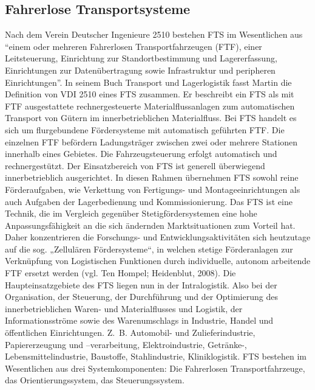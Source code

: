 \subsection{Fahrerlose Transportsysteme}
Nach dem Verein Deutscher Ingenieure 2510 bestehen FTS im Wesentlichen aus "`einem oder mehreren 
Fahrerlosen Transportfahrzeugen (FTF), einer Leitsteuerung, Einrichtung zur Standortbestimmung und 
Lagererfassung, Einrichtungen zur Daten\"ubertragung sowie Infrastruktur und peripheren Einrichtungen"'. 
In seinem Buch Transport und Lagerlogistik fasst Martin die Definition von VDI 2510 eines FTS zusammen.
Er beschreibt ein FTS als mit FTF ausgestattete rechnergesteuerte Materialflussanlagen zum automatischen 
Transport von G\"utern im innerbetrieblichen Materialfluss\cite[vgl.][S. 262f]{Martin:2006}. Bei FTS handelt 
es sich um flurgebundene F\"ordersysteme mit automatisch gef\"uhrten FTF. Die einzelnen FTF bef\"ordern 
Ladungstr\"ager zwischen zwei oder mehrere Stationen innerhalb eines Gebietes. Die Fahrzeugsteuerung erfolgt 
automatisch und rechnergest\"utzt. Der Einsatzbereich von FTS ist generell \"uberwiegend innerbetrieblich 
ausgerichtet. In diesen Rahmen \"ubernehmen FTS sowohl reine F\"orderaufgaben, wie Verkettung von Fertigungs- 
und Montageeinrichtungen als auch Aufgaben der Lagerbedienung und Kommissionierung\cite[vgl.][S. 3]{Guenther;Krueger:2000}. 
Das FTS ist eine Technik, die im Vergleich gegen\"uber Stetigf\"ordersystemen eine hohe Anpassungsf\"ahigkeit an die 
sich \"andernden Marktsituationen zum Vorteil hat. Daher konzentrieren die Forschungs- und Entwicklungsaktivit\"aten 
sich heutzutage auf die sog. „Zellul\"aren F\"ordersysteme“, in welchen stetige F\"orderanlagen zur Verkn\"upfung von 
Logistischen Funktionen durch individuelle, autonom arbeitende FTF ersetzt werden (vgl. Ten Hompel; Heidenblut, 2008). 
Die Haupteinsatzgebiete des FTS liegen nun in der Intralogistik. Also bei der Organisation, der Steuerung, 
der Durchf\"uhrung und der Optimierung des innerbetrieblichen Waren- und Materialflusses und Logistik, 
der Informationsstr\"ome sowie des Warenumschlags in Industrie, Handel und \"offentlichen Einrichtungen. 
Z.~B. Automobil- und Zulieferindustrie, Papiererzeugung und –verarbeitung, Elektroindustrie, Getr\"anke-, 
Lebensmittelindustrie, Baustoffe, Stahlindustrie, Kliniklogistik\cite[vgl.][S. 13]{Guenther:2011}. FTS bestehen 
im Wesentlichen aus drei Systemkomponenten: Die Fahrerlosen Transportfahrzeuge, das Orientierungssystem, das Steuerungssystem. 

